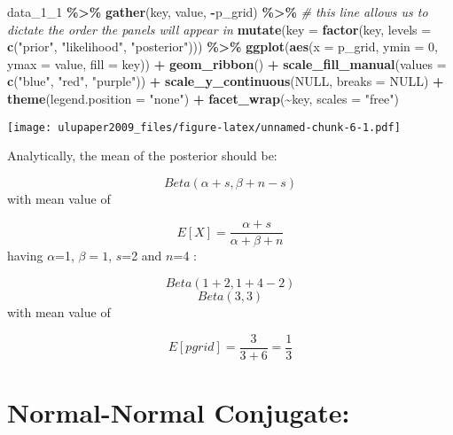 \documentclass[
]{book}
\newenvironment{Shaded}{\begin{snugshade}}{\end{snugshade}}
\newcommand{\CommentTok}[1]{\textcolor[rgb]{0.56,0.35,0.01}{\textit{#1}}}
\newcommand{\DataTypeTok}[1]{\textcolor[rgb]{0.13,0.29,0.53}{#1}}
\newcommand{\DecValTok}[1]{\textcolor[rgb]{0.00,0.00,0.81}{#1}}
\newcommand{\KeywordTok}[1]{\textcolor[rgb]{0.13,0.29,0.53}{\textbf{#1}}}
\newcommand{\NormalTok}[1]{#1}
\newcommand{\OperatorTok}[1]{\textcolor[rgb]{0.81,0.36,0.00}{\textbf{#1}}}
\newcommand{\OtherTok}[1]{\textcolor[rgb]{0.56,0.35,0.01}{#1}}
\newcommand{\StringTok}[1]{\textcolor[rgb]{0.31,0.60,0.02}{#1}}
\begin{document}
\begin{Shaded}
\begin{Highlighting}[]
\NormalTok{data\_}\DecValTok{1}\NormalTok{\_}\DecValTok{1} \OperatorTok{\%\textgreater{}\%}\StringTok{ }
\StringTok{  }\KeywordTok{gather}\NormalTok{(key, value, }\OperatorTok{{-}}\NormalTok{p\_grid) }\OperatorTok{\%\textgreater{}\%}\StringTok{  }
\StringTok{  }\CommentTok{\# this line allows us to dictate the order the panels will appear in}
\StringTok{  }\KeywordTok{mutate}\NormalTok{(}\DataTypeTok{key =} \KeywordTok{factor}\NormalTok{(key, }\DataTypeTok{levels =} \KeywordTok{c}\NormalTok{(}\StringTok{"prior"}\NormalTok{, }\StringTok{"likelihood"}\NormalTok{, }\StringTok{"posterior"}\NormalTok{))) }\OperatorTok{\%\textgreater{}\%}\StringTok{ }
\StringTok{  }\KeywordTok{ggplot}\NormalTok{(}\KeywordTok{aes}\NormalTok{(}\DataTypeTok{x =}\NormalTok{ p\_grid, }\DataTypeTok{ymin =} \DecValTok{0}\NormalTok{, }\DataTypeTok{ymax =}\NormalTok{ value, }\DataTypeTok{fill =}\NormalTok{ key)) }\OperatorTok{+}
\StringTok{  }\KeywordTok{geom\_ribbon}\NormalTok{() }\OperatorTok{+}
\StringTok{  }\KeywordTok{scale\_fill\_manual}\NormalTok{(}\DataTypeTok{values =} \KeywordTok{c}\NormalTok{(}\StringTok{"blue"}\NormalTok{, }\StringTok{"red"}\NormalTok{, }\StringTok{"purple"}\NormalTok{)) }\OperatorTok{+}
\StringTok{  }\KeywordTok{scale\_y\_continuous}\NormalTok{(}\OtherTok{NULL}\NormalTok{, }\DataTypeTok{breaks =} \OtherTok{NULL}\NormalTok{) }\OperatorTok{+}
\StringTok{  }\KeywordTok{theme}\NormalTok{(}\DataTypeTok{legend.position =} \StringTok{"none"}\NormalTok{) }\OperatorTok{+}
\StringTok{  }\KeywordTok{facet\_wrap}\NormalTok{(}\OperatorTok{\textasciitilde{}}\NormalTok{key, }\DataTypeTok{scales =} \StringTok{"free"}\NormalTok{)}
\end{Highlighting}
\end{Shaded}

\texttt{[image: ulupaper2009\_files/figure-latex/unnamed-chunk-6-1.pdf]}

Analytically, the mean of the posterior should be:

\[Beta(\alpha + s, \beta + n -s)\]
with mean value of

\[E[X]=\frac{\alpha + s}{\alpha + \beta + n}\]
having \(\alpha\)=1, \(\beta=1\), \(s\)=2 and \(n\)=4 :

\[Beta(1 + 2, 1+ 4-2)\]
\[Beta(3, 3)\]
with mean value of

\[E[pgrid]=\frac{3}{3+6}=\frac{1}{3}\]

\hypertarget{normal-normal-conjugate}{%
\section{Normal-Normal Conjugate:}\label{normal-normal-conjugate}}
\end{document}
